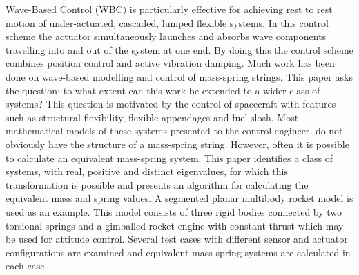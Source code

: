 \documentclass{mbd_fullpaper}
\begin{document}
Wave-Based Control (WBC) is particularly effective for achieving rest to rest motion of under-actuated, cascaded, lumped flexible systems.
In this control scheme the actuator simultaneously launches and absorbs wave components travelling into and out of the system at one end.
By doing this the control scheme combines position control and active vibration damping.
Much work has been done on wave-based modelling and control of mass-spring strings.
This paper asks the question: to what extent can this work be extended to a wider class of systems?
This question is motivated by the control of spacecraft with features such as structural flexibility, flexible appendages and fuel slosh.
Most mathematical models of these systems presented to the control engineer, do not obviously have the structure of a mass-spring string.
However, often it is possible to calculate an equivalent mass-spring system.
This paper identifies a class of systems, with real, positive and distinct eigenvalues, for which this transformation is possible and presents an algorithm for calculating the equivalent mass and spring values.
A segmented planar multibody rocket model is used as an example.
This model consists of three rigid bodies connected by two torsional springs and a gimballed rocket engine with constant thrust which may be used for attitude control.
Several test cases with different sensor and actuator configurations are examined and equivalent mass-spring systems are calculated in each case.

\end{document}
